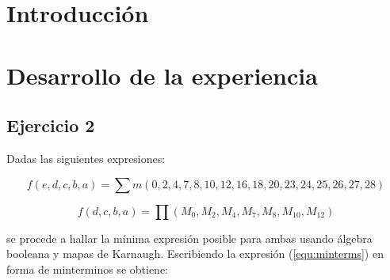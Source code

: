 \documentclass[a4paper]{article}
\begin{document}




\section*{Introducción}


\section*{Desarrollo de la experiencia}


\subsection*{Ejercicio 2}

Dadas las siguientes expresiones:

\begin{equation}
f \left( e,d,c,b,a \right) = \sum m \left( 0,2,4,7,8,10,12,16,18,20,23,24,25,26,27,28 \right)
\label{equ:minterms}
\end{equation}

\begin{equation}
f \left( d,c,b,a \right) = \prod \left( M_0,M_2,M_4,M_7,M_8,M_{10},M_{12} \right)
\label{equ:maxterms}
\end{equation}

se procede a hallar la mínima expresión posible para ambas usando álgebra booleana y mapas de Karnaugh.
Escribiendo la expresión (\ref{equ:minterms}) en forma de minterminos se obtiene:
\end{document}

